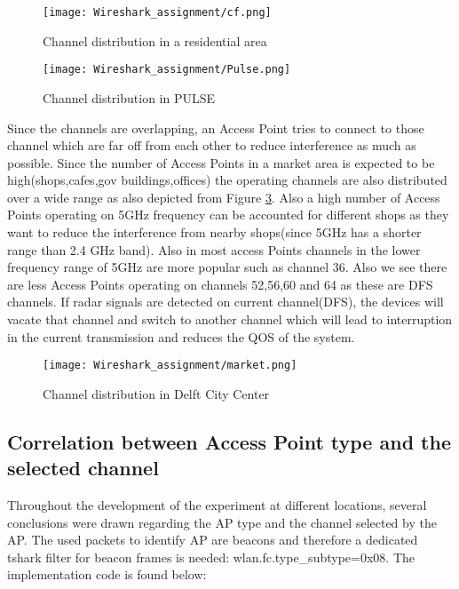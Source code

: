 \documentclass[conference]{IEEEtran}
\begin{document}
\begin{figure}[ht]
    \centering
    \texttt{[image: Wireshark\_assignment/cf.png]}
    \caption{Channel distribution in a residential area}
   \label{fig:CF}
\end{figure}

\begin{figure}[ht]
    \centering
    \texttt{[image: Wireshark\_assignment/Pulse.png]}
    \caption{Channel distribution in PULSE}
   \label{fig:PULSE}
\end{figure}

Since the channels are overlapping, an Access Point tries to connect to those channel which are far off from each other to reduce interference as much as possible. Since the number of Access Points in a market area is expected to be high(shops,cafes,gov buildings,offices) the operating channels are also distributed over a wide range as also depicted from Figure \ref{fig:Market}. Also a high number of Access Points operating on 5GHz frequency can be accounted for different shops as they want to reduce the interference from nearby shops(since 5GHz has a shorter range than 2.4 GHz band). Also in most access Points channels in the lower frequency range of 5GHz are more popular such as channel 36. Also we see there are less Access Points operating on channels 52,56,60 and 64 as these are DFS channels. If radar signals are detected on current channel(DFS), the devices will vacate that channel and switch to another channel which will lead to interruption in the current transmission and reduces the QOS of the system. 

\begin{figure}[ht]
    \centering
    \texttt{[image: Wireshark\_assignment/market.png]}
    \caption{Channel distribution in Delft City Center}
   \label{fig:Market}
\end{figure}

\subsection{Correlation between Access Point type and the selected channel} \label{sec:correll}
Throughout the development of the experiment at different locations, several conclusions were drawn regarding the AP type and the channel selected by the AP.
The used packets to identify AP are beacons and therefore a dedicated tshark filter for beacon frames is needed: wlan.fc.type\_subtype=0x08. The implementation code is found below:
\end{document}
